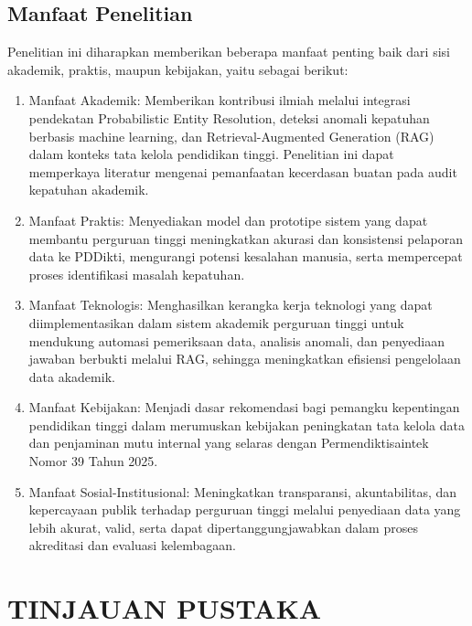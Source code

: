 \documentclass[12pt,a4paper,oneside]{report}
\begin{document}
        \section{Manfaat Penelitian}
            Penelitian ini diharapkan memberikan beberapa manfaat penting baik dari sisi akademik, praktis, maupun kebijakan, yaitu sebagai berikut:
            \begin{enumerate}
                \item Manfaat Akademik: Memberikan kontribusi ilmiah melalui integrasi pendekatan Probabilistic Entity Resolution, deteksi anomali kepatuhan berbasis machine learning, dan Retrieval-Augmented Generation (RAG) dalam konteks tata kelola pendidikan tinggi. Penelitian ini dapat memperkaya literatur mengenai pemanfaatan kecerdasan buatan pada audit kepatuhan akademik.
                \item Manfaat Praktis: Menyediakan model dan prototipe sistem yang dapat membantu perguruan tinggi meningkatkan akurasi dan konsistensi pelaporan data ke PDDikti, mengurangi potensi kesalahan manusia, serta mempercepat proses identifikasi masalah kepatuhan.
                \item Manfaat Teknologis: Menghasilkan kerangka kerja teknologi yang dapat diimplementasikan dalam sistem akademik perguruan tinggi untuk mendukung automasi pemeriksaan data, analisis anomali, dan penyediaan jawaban berbukti melalui RAG, sehingga meningkatkan efisiensi pengelolaan data akademik.
                \item Manfaat Kebijakan: Menjadi dasar rekomendasi bagi pemangku kepentingan pendidikan tinggi dalam merumuskan kebijakan peningkatan tata kelola data dan penjaminan mutu internal yang selaras dengan Permendiktisaintek Nomor 39 Tahun 2025.
                \item Manfaat Sosial-Institusional: Meningkatkan transparansi, akuntabilitas, dan kepercayaan publik terhadap perguruan tinggi melalui penyediaan data yang lebih akurat, valid, serta dapat dipertanggungjawabkan dalam proses akreditasi dan evaluasi kelembagaan.
            \end{enumerate}
    \onehalfspacing
    \chapter{TINJAUAN PUSTAKA}
    \thispagestyle{empty}
\end{document}

